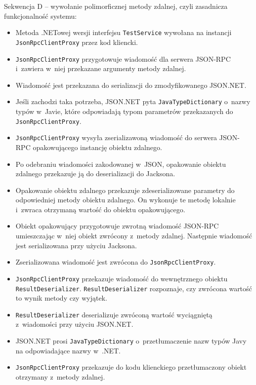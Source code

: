 Sekwencja D -- wywołanie polimorficznej metody zdalnej, czyli zasadnicza funkcjonalność systemu:
\begin{itemize}
	\item Metoda .NETowej wersji interfejsu \texttt{TestService} wywołana na instancji \texttt{JsonRpcClientProxy} przez kod kliencki. 
	\item \texttt{JsonRpcClientProxy} przygotowuje wiadomość dla serwera JSON-RPC i~zawiera w~niej przekazane argumenty metody zdalnej.
	\item Wiadomość jest przekazana do serializacji do zmodyfikowanego JSON.NET.
	\item Jeśli zachodzi taka potrzeba, JSON.NET pyta \texttt{JavaTypeDictionary} o~nazwy typów w~Javie, które odpowiadają typom parametrów przekazanych do \texttt{JsonRpcClientProxy}.
	\item \texttt{JsonRpcClientProxy} wysyła zserializawoną wiadomość do serwera JSON-RPC opakowującego instancję obiektu zdalnego.
	\item Po odebraniu wiadomości zakodowanej w~JSON, opakowanie obiektu zdalnego przekazuje ją do deserializacji do Jacksona.
	\item Opakowanie obiektu zdalnego przekazuje zdeserializowane parametry do odpowiedniej metody obiektu zdalnego. On wykonuje te metodę lokalnie i~zwraca otrzymaną wartość do obiektu opakowującego.
	\item Obiekt opakowujący przygotowuje zwrotną wiadomość JSON-RPC umieszczając w~niej obiekt zwrócony z~metody zdalnej. Następnie wiadomość jest serializowana przy użyciu Jacksona.
	\item Zserializowana wiadomość jest zwrócona do \texttt{JsonRpcClientProxy}.
	\item \texttt{JsonRpcClientProxy} przekazuje wiadomość do wewnętrznego obiektu \texttt{ResultDeserializer}. \texttt{ResultDeserializer} rozpoznaje, czy zwrócona wartość to wynik metody czy wyjątek.
	\item \texttt{ResultDeserializer} deserializuje zwróconą wartość wyciągniętą z~wiadomości przy użyciu JSON.NET.
	\item JSON.NET prosi \texttt{JavaTypeDictionary} o~przetłumaczenie nazw typów Javy na odpowiadające nazwy w~.NET.
	\item \texttt{JsonRpcClientProxy} przekazuje do kodu klienckiego przetłumaczony obiekt otrzymany z~metody zdalnej.
\end{itemize}



